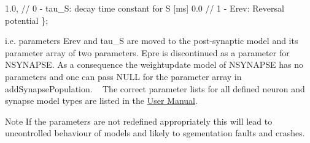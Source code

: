 \begin{DoxyEnumerate}
\begin{DoxyCode}
  1.0,            \textcolor{comment}{// 0 - tau\_S: decay time constant for S [ms]}
  0.0             \textcolor{comment}{// 1 - Erev: Reversal potential}
\};
\end{DoxyCode}
 i.\+e. parameters {\ttfamily Erev} and {\ttfamily tau\+\_\+\+S} are moved to the post-\/synaptic model and its parameter array of two parameters. {\ttfamily Epre} is discontinued as a parameter for {\ttfamily N\+S\+Y\+N\+A\+P\+S\+E}. As a consequence the weightupdate model of {\ttfamily N\+S\+Y\+N\+A\+P\+S\+E} has no parameters and one can pass {\ttfamily N\+U\+L\+L} for the parameter array in {\ttfamily add\+Synapse\+Population}. ~\newline
 The correct parameter lists for all defined neuron and synapse model types are listed in the \hyperlink{UserManual}{User Manual}. \begin{DoxyNote}{Note}
If the parameters are not redefined appropriately this will lead to uncontrolled behaviour of models and likely to sgementation faults and crashes.
\end{DoxyNote}


\end{DoxyEnumerate}
